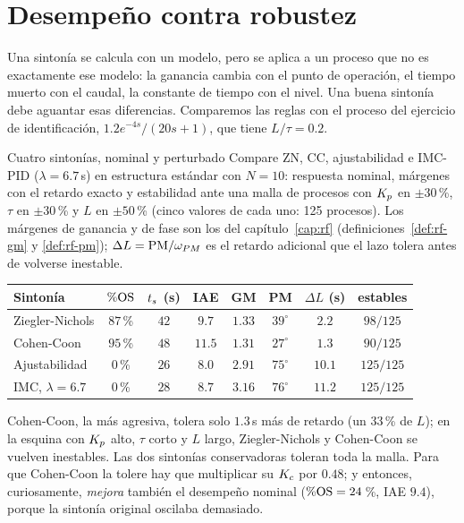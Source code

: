 \section{Desempeño contra robustez}
\label{sec:ps-robustez}

Una sintonía se calcula con un modelo, pero se aplica a un proceso que no es exactamente ese modelo: la ganancia cambia con el punto de operación, el tiempo muerto con el caudal, la constante de tiempo con el nivel. Una buena sintonía debe aguantar esas diferencias. Comparemos las reglas con el proceso del ejercicio de identificación, $1.2e^{-4s}/(20s+1)$, que tiene $L/\tau=0.2$.

\begin{ejemplo}[label=ej:ps-robustez]{Cuatro sintonías, nominal y perturbado}
Compare ZN, CC, ajustabilidad e IMC-PID ($\lambda=6.7$\,s) en estructura estándar con $N=10$: respuesta nominal, márgenes con el retardo exacto y estabilidad ante una malla de procesos con $K_p$ en $\pm30$\,\%, $\tau$ en $\pm30$\,\% y $L$ en $\pm50$\,\% (cinco valores de cada uno: 125 procesos).
\solucion Los márgenes de ganancia y de fase son los del capítulo~\ref{cap:rf} (definiciones~\ref{def:rf-gm} y \ref{def:rf-pm}); $\Delta L=\mathrm{PM}/\omega_{PM}$ es el retardo adicional que el lazo tolera antes de volverse inestable.
\begin{center}
\renewcommand{\arraystretch}{1.2}
\begin{tabular}{@{}lccccccc@{}}
\toprule
Sintonía & $\%\mathrm{OS}$ & $t_s$ (s) & IAE & GM & PM & $\Delta L$ (s) & estables\\
\midrule
Ziegler-Nichols & $87$\,\% & $42$ & $9.7$ & $1.33$ & $39^\circ$ & $2.2$ & $98/125$\\
Cohen-Coon & $95$\,\% & $48$ & $11.5$ & $1.31$ & $27^\circ$ & $1.3$ & $90/125$\\
Ajustabilidad & $0$\,\% & $26$ & $8.0$ & $2.91$ & $75^\circ$ & $10.1$ & $125/125$\\
IMC, $\lambda=6.7$ & $0$\,\% & $28$ & $8.7$ & $3.16$ & $76^\circ$ & $11.2$ & $125/125$\\
\bottomrule
\end{tabular}
\end{center}
Cohen-Coon, la más agresiva, tolera solo $1.3$\,s más de retardo (un $33$\,\% de $L$); en la esquina con $K_p$ alto, $\tau$ corto y $L$ largo, Ziegler-Nichols y Cohen-Coon se vuelven inestables. Las dos sintonías conservadoras toleran toda la malla. Para que Cohen-Coon la tolere hay que multiplicar su $K_c$ por $0.48$; y entonces, curiosamente, \emph{mejora} también el desempeño nominal ($\%\mathrm{OS}=24$\,\%, IAE $9.4$), porque la sintonía original oscilaba demasiado.
\end{ejemplo}

